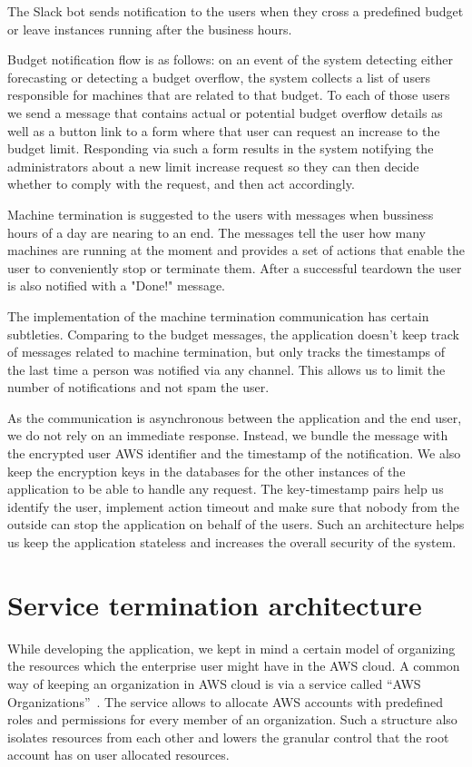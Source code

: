 \documentclass[licencjacka,en]{thesisclass}
\begin{document}
    The Slack bot sends notification to the users when they cross
    a predefined budget or leave instances running after the business hours.

    Budget notification flow is as follows: on an event of the system detecting
    either forecasting or detecting a budget overflow, the system collects
    a list of users responsible for machines that are related to that budget.
    To each of those users we send a message that contains actual or potential
    budget overflow details as well as a button link to a form where that user can request
    an increase to the budget limit.
    Responding via such a form results in the system notifying the administrators
    about a new limit increase request so they can then decide whether to comply
    with the request, and then act accordingly.

    Machine termination is suggested to the users with messages
    when bussiness hours of a day are nearing to an end.
    The messages tell the user how many machines are running at the moment
    and provides a set of actions that enable the user to conveniently stop
    or terminate them.
    After a successful teardown the user is also notified with a "Done!" message.

    The implementation of the machine termination communication has certain subtleties.
    Comparing to the budget messages, the application doesn’t keep track of messages
    related to machine termination, but
    only tracks the timestamps of the last time a person was notified via any channel.
    This allows us to limit the number of notifications and not spam the user.

    As the communication is asynchronous between the application and the end user,
    we do not rely on an immediate response.
    Instead, we bundle the message with the encrypted user AWS identifier
    and the timestamp of the notification.
    We also keep the encryption keys in the databases for the other instances
    of the application to be able to handle any request.
    The key-timestamp pairs help us identify the user, implement action timeout
    and make sure that nobody from the outside can stop the application
    on behalf of the users.
    Such an architecture helps us keep the application stateless
    and increases the overall security of the system.

    \section{Service termination architecture}
    While developing the application, we kept in mind a certain model
    of organizing the resources
    which the enterprise user might have in the AWS cloud.
    A common way of keeping an organization in AWS cloud
    is via a service called “AWS Organizations”~\cite{AWSOrganizations}.
    The service allows to allocate AWS accounts
    with predefined roles and permissions for every member of an organization.
    Such a structure also isolates resources from each other
    and lowers the granular control that the root account has on user allocated resources.
\end{document}

